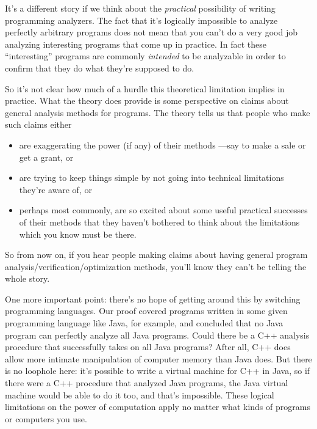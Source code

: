 It's a different story if we think about the \emph{practical}
possibility of writing programming analyzers.  The fact that it's
logically impossible to analyze perfectly arbitrary programs does not
mean that you can't do a very good job analyzing interesting programs
that come up in practice.  In fact these ``interesting'' programs are
commonly \emph{intended} to be analyzable in order to confirm that
they do what they're supposed to do.

So it's not clear how much of a hurdle this theoretical limitation
implies in practice.  What the theory does provide is some perspective
on claims about general analysis methods for programs.  The theory
tells us that people who make such claims either

\begin{itemize}
\item are exaggerating the power (if any) of their methods ---say to make a
  sale or get a grant, or

\item are trying to keep things simple by not going into technical
  limitations they're aware of, or

\item perhaps most commonly, are so excited about some useful practical
    successes of their methods that they haven't bothered to think about
    the limitations which you know must be there.
\end{itemize}

So from now on, if you hear people making claims about having general
program analysis/verification/optimization methods, you'll know they can't
be telling the whole story.

One more important point: there's no hope of getting around this by
switching programming languages.  Our proof covered programs written
in some given programming language like Java, for example, and
concluded that no Java program can perfectly analyze all Java
programs.  Could there be a C++ analysis procedure that successfully
takes on all Java programs?  After all, C++ does allow more intimate
manipulation of computer memory than Java does.  But there is no
loophole here: it's possible to write a virtual machine for C++ in
Java, so if there were a C++ procedure that analyzed Java programs,
the Java virtual machine would be able to do it too, and that's
impossible.  These logical limitations on the power of computation
apply no matter what kinds of programs or computers you use.

